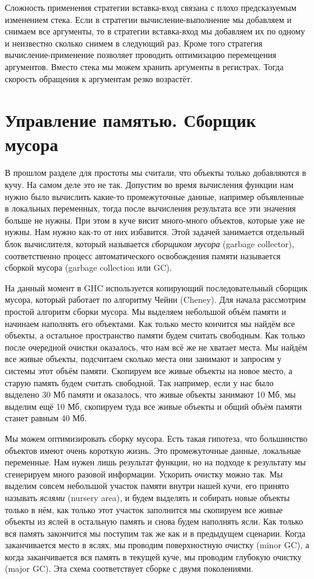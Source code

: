 Сложность применения стратегии вставка-вход связана
с плохо предсказуемым изменением стека. Если в стратегии вычисление-выполнение
мы добавляем и снимаем все аргументы, то в стратегии вставка-вход
мы добавляем их по одному и неизвестно сколько снимем в следующий раз.
Кроме того стратегия вычисление-применение позволяет проводить
оптимизацию перемещения аргументов. Вместо стека мы можем хранить
аргументы в регистрах. Тогда скорость обращения к аргументам
резко возрастёт. 

\section{Управление памятью. Сборщик мусора}

В прошлом разделе для простоты мы считали, что объекты только добавляются
в кучу. На самом деле это не так. Допустим во время вычисления функции
нам нужно было вычислить какие-то промежуточные данные, например
объявленные в локальных переменных, тогда после вычисления результата
все эти значения больше не нужны. При этом в куче висит
много-много объектов, которые уже не нужны. Нам нужно 
как-то от них избавится. Этой задачей занимается отдельный 
блок вычислителя, который называется \emph{сборщиком мусора} 
(garbage collector), соответственно процесс автоматического
освобождения памяти называется сборкой мусора (garbage collection или GC).

На данный момент в GHC используется копирующий последовательный
сборщик мусора, который работает по алгоритму Чейни (Cheney). 
Для начала рассмотрим простой алгоритм сборки мусора.
Мы выделяем небольшой объём памяти и начинаем наполнять
его объектами. Как только место кончится мы 
найдём все  объекты, а остальное
пространство памяти будем считать свободным. 
Как только после очередной очистки оказалось, что 
нам всё же не хватает места. Мы найдём все живые 
объекты, подсчитаем сколько места они занимают и
запросим у системы этот объём памяти. Скопируем все
живые объекты на новое место, а старую память будем 
считать свободной. 
Так например, если у нас было выделено 30 Мб памяти и оказалось,
что живые объекты занимают 10 Мб, мы выделим ещё 10 Мб, скопируем
туда все живые объекты и общий объём памяти станет равным 40 Мб.

Мы можем оптимизировать сборку мусора. Есть такая гипотеза,
что большинство объектов имеют очень короткую жизнь.
Это промежуточные данные, локальные переменные. 
Нам нужен лишь результат функции, но на подходе к 
результату мы сгенерируем много разовой информации.
Ускорить очистку можно так. Мы выделим совсем небольшой
участок памяти внутри нашей кучи, его принято
называть \emph{яслями} (nursery area), и будем выделять и собирать
новые объекты только в нём, как только этот участок 
заполнится мы скопируем все живые объекты из яслей
в остальную память и снова будем наполнять ясли. 
Как только вся память закончится мы поступим
так же как и в предыдущем сценарии. 
Когда заканчивается место в яслях, мы проводим 
поверхностную очистку (minor GC), а когда заканчивается
вся память в текущей куче, мы проводим глубокую очистку
(major GC). Эта схема соответствует сборке с двумя
поколениями. 

